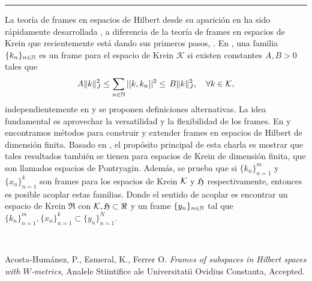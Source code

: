 \begin{titlepage}
\begin{minipage}{0.5\linewidth}
\begin{minipage}{0.45\linewidth}
    \begin{flushright}
        \printauthor
    \end{flushright}
\end{minipage} \hspace{0pt}
%
\begin{minipage}{0.02\linewidth}
      \color{ptctitle} \rule{1pt}{175pt}
\end{minipage} 
\end{minipage}
\hspace*{-4.5cm}
%
\begin{minipage}{0.85\linewidth}
\begin{minipage}{0.85\linewidth}
\footnotesize
\vspace{5pt}
    \begin{resumen}La teor\'ia de frames en espacios de Hilbert desde su aparici\'on en \cite{DS} ha sido r\'apidamente desarrollada \cite{Casazza,CasazzaLeon, Dau,Deguang,G,RNG} , a diferencia de la teor\'ia de frames en espacios de Krein que recientemente est\'a dando sus primeros pasos, \cite{POK,KEFER,GMMM,GMMMa,PW}. En \cite{KEFER}, una familia $\{k_{n}\}_{n\in\mathbb{N}}$ es un frame para el espacio de Krein $\mathcal{K}$ si existen constantes $A,B>0$ tales que
\begin{equation*}
  A\|k\|_{J}^{2}\leq\sum_{n\in\mathbb{N}}|[k,k_{n}]|^{2}\leq\,B\|k\|_{J}^{2},\quad\forall k\in\mathcal{K},
\end{equation*}
independientemente en \cite{GMMM} y \cite{PW} se proponen definiciones alternativas. La idea fundamental  es aprovechar la versatilidad y la flexibilidad de los frames. En \cite{CasazzaLeon} y \cite{Deguang} encontramos m\'etodos para construir y extender frames en espacios de Hilbert de dimensi\'on finita. Basado en \cite{KEFER}, el prop\'osito principal de esta charla es mostrar que tales resultados tambi\'en se tienen para espacios de Krein de dimensi\'on finita, que son llamados espacios de Pontryagin.  Adem\'as,  se prueba que si $\{k_{n}\}_{n=1}^{m}$ y $\{x_{n}\}_{n=1}^{k}$ son frames para los espacios de Krein $\mathcal{K}$ y $\mathfrak{H}$ respectivamente, entonces es posible acoplar estas familias. Donde el sentido de acoplar es encontrar un espacio de Krein $\Re$ con $\mathcal{K},\mathfrak{H}\subset\Re$ y un frame  $\{y_{n}\}_{n\in\mathbb{N}}$  tal que $\{k_{n}\}_{n=1}^{m},\{x_{n}\}_{n=1}^{k}\subset \{y_{n}\}_{n=1}^{N}$.

    \end{resumen}
   \end{minipage}
   \vspace{10pt}
\end{minipage}
\vspace{10pt}\\[5pt]
\begin{thebibliography}{99}
Acosta-Hum\'anez, P., Esmeral, K., Ferrer O. \textit{Frames of subspaces in Hilbert spaces with $W$-metrics}, Analele Stiintifice ale Universitatii Ovidius Constanta, Accepted.


\end{thebibliography}
\end{titlepage}

